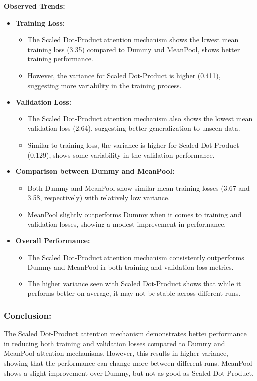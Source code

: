 \documentclass{article}
\begin{document}
\textbf{Observed Trends:}

\begin{itemize}
    \item \textbf{Training Loss:}
    \begin{itemize}
        \item The Scaled Dot-Product attention mechanism shows the lowest mean training loss (3.35) compared to Dummy and MeanPool, shows better training performance.
        \item However, the variance for Scaled Dot-Product is higher (0.411), suggesting more variability in the training process.
    \end{itemize}
    \item \textbf{Validation Loss:}
    \begin{itemize}
        \item The Scaled Dot-Product attention mechanism also shows the lowest mean validation loss (2.64), suggesting better generalization to unseen data.
        \item Similar to training loss, the variance is higher for Scaled Dot-Product (0.129), shows some variability in the validation performance.
    \end{itemize}
    \item \textbf{Comparison between Dummy and MeanPool:}
    \begin{itemize}
        \item Both Dummy and MeanPool show similar mean training losses (3.67 and 3.58, respectively) with relatively low variance.
        \item MeanPool slightly outperforms Dummy when it comes to training and validation losses, showing a modest improvement in performance.
    \end{itemize}
    \item \textbf{Overall Performance:}
    \begin{itemize}
        \item The Scaled Dot-Product attention mechanism consistently outperforms Dummy and MeanPool in both training and validation loss metrics.
        \item The higher variance seen with Scaled Dot-Product shows that while it performs better on average, it may not be stable across different runs.
    \end{itemize}
\end{itemize}

\subsubsection*{Conclusion:}
The Scaled Dot-Product attention mechanism demonstrates better performance in reducing both training and validation losses compared to Dummy and MeanPool attention mechanisms. However, this results in higher variance, showing that the performance can change more between different runs. MeanPool shows a slight improvement over Dummy, but not as good as Scaled Dot-Product.
\end{document}
